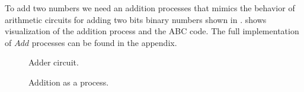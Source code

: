 To add two numbers we need an addition processes that mimics the behavior of arithmetic circuits for adding two bits binary numbers shown in 
.
 shows visualization of the addition process and the ABC code.
The full implementation of $Add$ processes can be found in the appendix.
\begin{figure}[H]%
\centering
{}
\caption{Adder circuit.}
\label{tra_adder_circuit}%
\end{figure}


\begin{figure}[H]%
\centering
\hspace{\fill}
%
\hspace{1em}%
%
\vspace{2em}
%
\caption{Addition as a process.}
\label{tra_addition}%
\end{figure}

